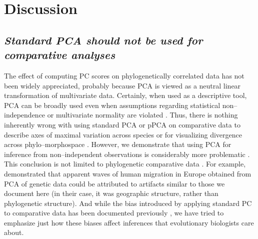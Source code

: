 \documentclass[a4paper,12pt]{article}
\begin{document}

\section{Discussion}
\subsection{\emph{Standard PCA should not be used for comparative analyses}} 

The effect of computing PC scores on phylogenetically correlated data has not been widely appreciated, probably because PCA is viewed as a neutral linear transformation of multivariate data. Certainly, when used as a descriptive tool, PCA can be broadly used even when assumptions regarding statistical non--independence or multivariate normality are violated \citep{Jolliffe2002}. Thus, there is nothing inherently wrong with using standard PCA or pPCA on comparative data to describe axes of maximal variation across species or for visualizing divergence across phylo--morphospace \citep{Sidlauskas2008}. However, we demonstrate that using PCA for inference from non--independent observations is considerably more problematic \citep{Jolliffe2002}. This conclusion is not limited to phylogenetic comparative data \citep[see][]{Richman1986, Podani2002, Novembre, Bookstein2012}. For example, \citet{Novembre} demonstrated that apparent waves of human migration in Europe obtained from PCA of genetic data \citep[e.g.,][]{Cavalli} could be attributed to artifacts similar to those we document here (in their case, it was geographic structure, rather than phylogenetic structure). And while the bias introduced by applying standard PC to comparative data has been documented previously \citep{Revell2008, Polly2013}, we have tried to emphasize just how these biases affect inferences that evolutionary biologists care about.
\end{document}
